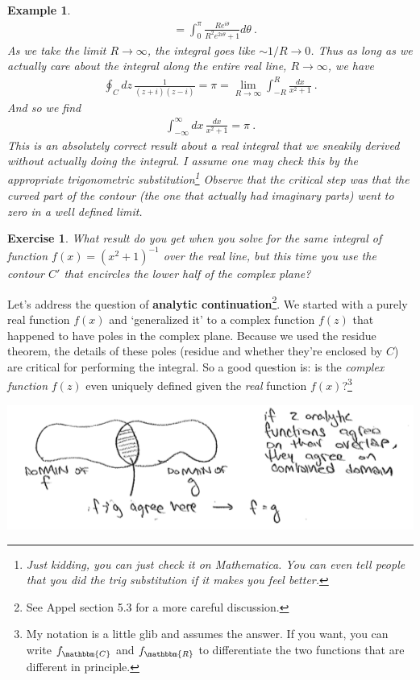 \documentclass[
  11pt,
	colorful,
	raggedright,
]{tufte-style-thesis-flip}
\newtheorem{exercise}{Exercise}[section]
\newtheorem{example}{Example}[section]
\begin{document}
\begin{example}
\begin{align}
  &= 
  \int_0^\pi
  \frac{Re^{i\theta}}{R^2 e^{2i\theta}+1} d\theta \ .
\end{align}
As we take the limit $R\to\infty$, the integral goes like $\sim 1/R \to 0$. Thus as long as we actually care about the integral along the entire real line, $R\to \infty$, we have
\begin{align}
  \oint_Cdz\, \frac{1}{(z+i)(z-i)}  
  = \pi 
  = \lim_{R\to\infty} \int_{-R}^R \frac{dx}{x^2+1} \ .
\end{align}
And so we find
\begin{align}
  \int_{-\infty}^\infty dx \, 
  \frac{dx}{x^2+1}
  = \pi \ .
\end{align}
This is an absolutely correct result about a \emph{real} integral that we sneakily derived without actually doing the integral. I assume one may check this by the appropriate trigonometric substitution\footnote{Just kidding, you can just check it on \emph{Mathematica}. You can even tell people that you did the trig substitution if it makes you feel better.} Observe that the critical step was that the curved part of the contour (the one that actually had imaginary parts) went to zero in a well defined limit. 
\end{example}
\begin{exercise}
What result do you get when you solve for the same integral of function $f(x)=(x^2+1)^{-1}$ over the real line, but this time you use the contour $C'$ that encircles the lower half of the complex plane?
\end{exercise}
Let's address the question of \textbf{analytic continuation}\footnote{See Appel section 5.3 for a more careful discussion.}. We started with a purely real function $f(x)$ and `generalized it' to a complex function $f(z)$ that happened to have poles in the complex plane. Because we used the residue theorem, the details of these poles (residue and whether they're enclosed by $C$) are critical for performing the integral. So a good question is: is the \emph{complex function} $f(z)$ even uniquely defined given the \emph{real} function $f(x)$?\footnote{My notation is a little glib and assumes the answer. If you want, you can write $f_\mathbbm{C}$ and $f_\mathbbm{R}$ to differentiate the two functions that are different in principle.}
\begin{center}
\includegraphics[width=.9\textwidth]{figures/Lec_2017_14_analytic_continuation.png}
\end{center}
\end{document}
